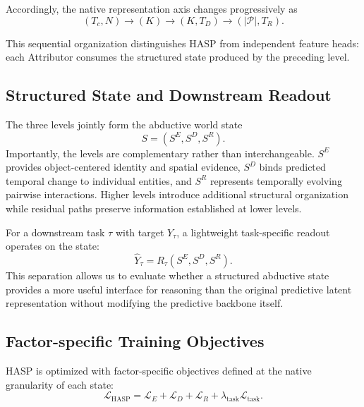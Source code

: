\documentclass{article}
\begin{document}
Accordingly, the native representation axis changes progressively as
\begin{equation}
    (T_c,N)
    \rightarrow
    (K)
    \rightarrow
    (K,T_D)
    \rightarrow
    (|\mathcal P|,T_R).
\end{equation}

This sequential organization distinguishes HASP from independent feature heads: each Attributor consumes the structured state produced by the preceding level.

\subsection{Structured State and Downstream Readout}
The three levels jointly form the abductive world state
\begin{equation}
    S=(S^E,S^D,S^R).
\end{equation}
Importantly, the levels are complementary rather than interchangeable. $S^E$ provides object-centered identity and spatial evidence, $S^D$ binds predicted temporal change to individual entities, and $S^R$ represents temporally evolving pairwise interactions. Higher levels introduce additional structural organization while residual paths preserve information established at lower levels.

For a downstream task $\tau$ with target $Y_\tau$, a lightweight task-specific readout operates on the state:
\begin{equation}
    \widehat{Y}_{\tau}
    =
    R_{\tau}(S^E,S^D,S^R).
    \label{eq:task-readout}
\end{equation}
This separation allows us to evaluate whether a structured abductive state provides a more useful interface for reasoning than the original predictive latent representation without modifying the predictive backbone itself.

\subsection{Factor-specific Training Objectives}
\label{app:training-detail}

HASP is optimized with factor-specific objectives defined at the native granularity of each state:
\begin{equation}
    \mathcal L_{\mathrm{HASP}}
    =
    \mathcal L_E
    +
    \mathcal L_D
    +
    \mathcal L_R
    +
    \lambda_{\mathrm{task}}\mathcal L_{\mathrm{task}}.
    \label{eq:app-training-loss}
\end{equation}
\end{document}
